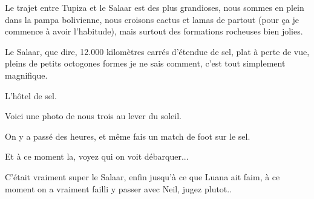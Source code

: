 \begin{multicols}{2}
Le trajet entre Tupiza et le Salaar est des plus grandioses, nous sommes en plein dans la pampa bolivienne, nous croisons cactus et lamas de partout (pour ça je commence à avoir l'habitude), mais surtout des formations rocheuses bien jolies.




Le Salaar, que dire, 12.000 kilomètres carrés d'étendue de sel, plat à perte de vue, pleins de petits octogones formes je ne sais comment, c'est tout simplement magnifique.

L'hôtel de sel.


Voici une photo de nous trois au lever du soleil.



On y a passé des heures, et même fais un match de foot sur le sel.


Et à ce moment la, voyez qui on voit débarquer...


C'était vraiment super le Salaar, enfin jusqu'à ce que Luana ait faim, à ce moment on a vraiment failli y passer avec Neil, jugez plutot..


\end{multicols}

